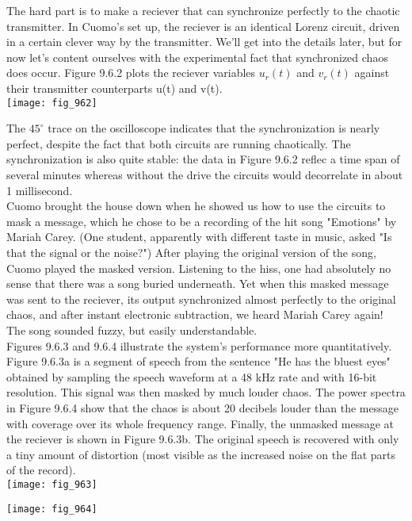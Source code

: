 \documentclass{article}
\newcommand\tab[1][1cm]{\hspace*{#1}}
\begin{document}
The hard part is to make a reciever that can synchronize perfectly to the chaotic transmitter. In Cuomo's set up, the reciever is an identical Lorenz circuit, driven in a certain clever way by the transmitter. We'll get into the details later, but for now let's content ourselves with the experimental fact that synchronized chaos does occur. Figure 9.6.2 plots the reciever variables $u_{r}(t)$ and $v_{r}(t)$ against their transmitter counterparts u(t) and v(t). \\

\texttt{[image: fig\_962]}

The $45^{\circ}$ trace on the oscilloscope indicates that the synchronization is nearly perfect, despite the fact that both circuits are running chaotically. The synchronization is also quite stable: the data in Figure 9.6.2 reflec a time span of several minutes whereas without the drive the circuits would decorrelate in about 1 millisecond. \\ \tab
Cuomo brought the house down when he showed us how to use the circuits to mask a message, which he chose to be a recording of the hit song "Emotions" by Mariah Carey. (One student, apparently with different taste in music, asked "Is that the signal or the noise?") After playing the original version of the song, Cuomo played the masked version. Listening to the hiss, one had absolutely no sense that there was a song buried underneath. Yet when this masked message was sent to the reciever, its output synchronized almost perfectly to the original chaos, and after instant electronic subtraction, we heard Mariah Carey again! The song sounded fuzzy, but easily understandable. \\ \tab
Figures 9.6.3 and 9.6.4 illustrate the system's performance more quantitatively. Figure 9.6.3a is a segment of speech from the sentence "He has the bluest eyes" obtained by sampling the speech waveform at a 48 kHz rate and with 16-bit resolution. This signal was then masked by much louder chaos. The power spectra in Figure 9.6.4 show that the chaos is about 20 decibels louder than the message with coverage over its whole frequency range. Finally, the unmasked message at the reciever is shown in Figure 9.6.3b. The original speech is recovered with only a tiny amount of distortion (most visible as the increased noise on the flat parts of the record). \\

\texttt{[image: fig\_963]}

\texttt{[image: fig\_964]}
\end{document}

